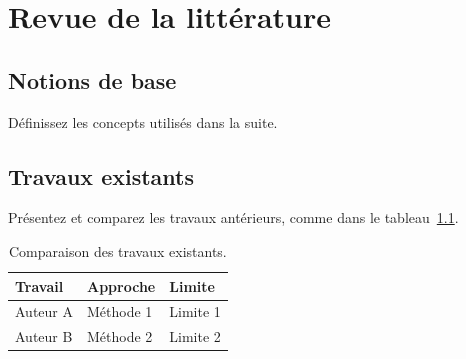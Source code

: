\chapter{Revue de la littérature}
\label{chap:revue}

\section{Notions de base}
Définissez les concepts utilisés dans la suite.

\section{Travaux existants}
Présentez et comparez les travaux antérieurs, comme dans le tableau~\ref{tab:comparaison}.

\begin{table}[h]
  \centering
  \begin{tabular}{lll}
    \hline
    Travail & Approche & Limite \\
    \hline
    Auteur A & Méthode 1 & Limite 1 \\
    Auteur B & Méthode 2 & Limite 2 \\
    \hline
  \end{tabular}
  \caption{Comparaison des travaux existants.}
  \label{tab:comparaison}
\end{table}
